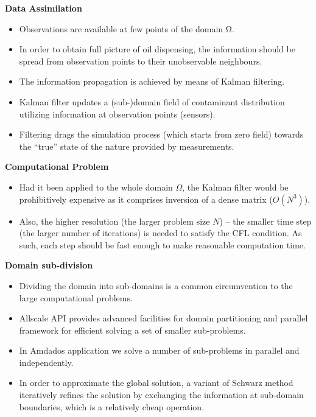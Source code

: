 \documentclass[12pt]{beamer}
\newcommand{\myTitle}{\rmfamily\bfseries}
\begin{document}
\begin{frame}{\myTitle Data Assimilation}
\begin{itemize}
\item Observations are available at few points of the domain Ω. 
\item In order to obtain full picture of oil dispensing, the information should be spread from observation points to their unobservable neighbours.
\item The information propagation is achieved by means of Kalman filtering.
\item Kalman filter updates a (sub-)domain field of contaminant distribution utilizing information at observation points (sensors). 
\item Filtering drags the simulation process (which starts from zero field) towards the “true” state of the nature provided by measurements.
\end{itemize}
\end{frame}

\begin{frame}{\myTitle Computational Problem}
\begin{itemize}
\item Had it been applied to the whole domain $\Omega$, the Kalman filter would be prohibitively expensive as it comprises inversion of a dense matrix ($O(N^3)$).
\item Also, the higher resolution (the larger problem size $N$) -- the smaller time step (the larger number of iterations) is needed to satisfy the CFL condition. As such, each step should be fast enough to make reasonable computation time.
\end{itemize}
\end{frame}

\begin{frame}{\myTitle Domain sub-division}
\begin{itemize}
\item Dividing the domain into sub-domains is a common circumvention to the large computational problems.
\item Allscale API provides advanced facilities for domain partitioning and parallel framework for efficient solving a set of smaller sub-problems.
\item In Amdados application we solve a number of sub-problems in parallel and independently.
\item In order to approximate the global solution, a variant of Schwarz method iteratively refines the solution by exchanging the information at sub-domain boundaries, which is a relatively cheap operation. 
\end{itemize}
\end{frame}
\end{document}
